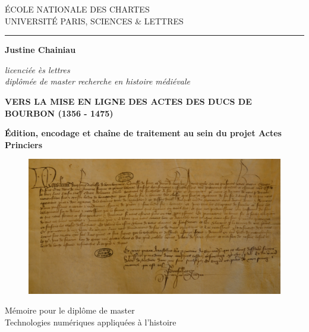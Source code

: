\begin{titlepage}
		\begin{center}
			
			\bigskip
			
			\begin{large}				
				ÉCOLE NATIONALE DES CHARTES\\
				UNIVERSITÉ PARIS, SCIENCES \& LETTRES
			\end{large}
			\begin{center}\rule{2cm}{0.02cm}\end{center}
			
			\bigskip
			\begin{Large}
				\textbf{Justine Chainiau}\\
			\end{Large}
			\begin{normalsize} \textit{licenciée ès lettres}\\
				\textit{diplômée de master recherche en histoire médiévale}
			\end{normalsize}
			\bigskip
			\bigskip
			
			\begin{Huge}
				\textbf{VERS LA MISE EN LIGNE DES ACTES DES DUCS DE BOURBON (1356 - 1475)}\\
			\end{Huge}
			\bigskip
			\bigskip
			\begin{LARGE}
				\textbf{Édition, encodage et chaîne de traitement au sein du projet \og Actes Princiers \fg}\\
			\end{LARGE}
			
			\begin{figure}[H]
            \centering
            \includegraphics[scale=0.09]{img/couverture.jpg}
            \label{fig:encodage_text}
            \end{figure}
			\vfill
			
			\begin{large}
				Mémoire 
				pour le diplôme de master \\
				\og{} Technologies numériques appliquées à l'histoire \fg{} \\
			\end{large}
			
		\end{center}
	\end{titlepage}